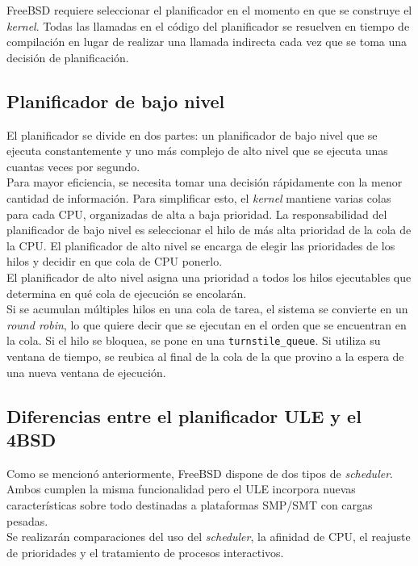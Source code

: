 \documentclass[a4paper]{book}
\begin{document}
FreeBSD requiere seleccionar el planificador en el momento en que se construye el \emph{kernel}. Todas las llamadas en el código del planificador se resuelven en tiempo de compilación en lugar de realizar una llamada indirecta cada vez que se toma una decisión de planificación.

\subsection{Planificador de bajo nivel}

El planificador se divide en dos partes: un planificador de bajo nivel que se ejecuta constantemente y uno más complejo de alto nivel que se ejecuta unas cuantas veces por segundo.\\

Para mayor eficiencia, se necesita tomar una decisión rápidamente con la menor cantidad de información. Para simplificar esto, el \emph{kernel} mantiene varias colas para cada CPU, organizadas de alta a baja prioridad. La responsabilidad del planificador de bajo nivel es seleccionar el hilo de más alta prioridad de la cola de la CPU. El planificador de alto nivel se encarga de elegir las prioridades de los hilos y decidir en que cola de CPU ponerlo.\\

El planificador de alto nivel asigna una prioridad a todos los hilos ejecutables que determina en qu\'e cola de ejecuci\'on se encolar\'an.\\

Si se acumulan múltiples hilos en una cola de tarea, el sistema se convierte en un \emph{round robin}, lo que quiere decir que se ejecutan en el orden que se encuentran en la cola. Si el hilo se bloquea, se pone en una \verb|turnstile_queue|. Si utiliza su ventana de tiempo, se reubica al final de la cola de la que provino a la espera de una nueva ventana de ejecución.

\subsection{Diferencias entre el planificador ULE y el 4BSD}

Como se mencionó anteriormente, FreeBSD dispone de dos tipos de \emph{scheduler}. Ambos cumplen la misma funcionalidad pero el ULE incorpora nuevas características sobre todo destinadas a plataformas SMP/SMT con cargas pesadas.\\

Se realizarán comparaciones del uso del \emph{scheduler}, la afinidad de CPU, el reajuste de prioridades y el tratamiento de procesos interactivos.\\
\end{document}

